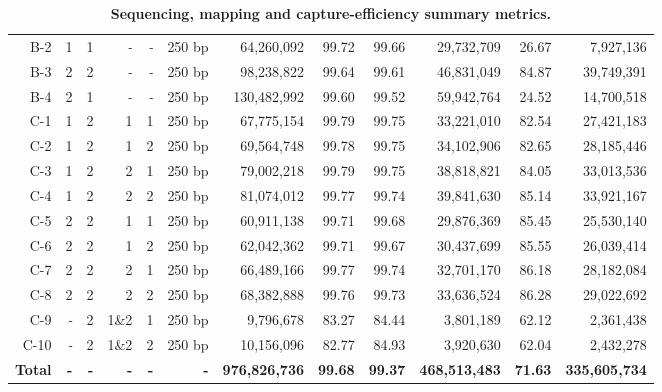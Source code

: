 \begin{sidewaystable}[p]
\begin{adjustbox}{width = 1\textwidth}
\begin{tabular}{rrrrrrrrrrrr}
        B-2 & 1 & 1 & \textit{-} & \textit{-} & 250 bp & 64,260,092 & 99.72 & 99.66 & 29,732,709 & 26.67 & 7,927,136 \\
        B-3 & 2 & 2 & \textit{-} & \textit{-} & 250 bp & 98,238,822 & 99.64 & 99.61 & 46,831,049 & 84.87 & 39,749,391 \\
        B-4 & 2 & 1 & \textit{-} & \textit{-} & 250 bp & 130,482,992 & 99.60 & 99.52 & 59,942,764 & 24.52 & 14,700,518 \\
		\cmidrule(l){1-1} \cmidrule(l){2-7} \cmidrule(l){8-9} \cmidrule(l){10-12}
        C-1 & 1 & 2 & 1 & 1 & 250 bp & 67,775,154 & 99.79 & 99.75 & 33,221,010 & 82.54 & 27,421,183 \\
        C-2 & 1 & 2 & 1 & 2 & 250 bp & 69,564,748 & 99.78 & 99.75 & 34,102,906 & 82.65 & 28,185,446 \\
        C-3 & 1 & 2 & 2 & 1 & 250 bp & 79,002,218 & 99.79 & 99.75 & 38,818,821 & 84.05 & 33,013,536 \\
        C-4 & 1 & 2 & 2 & 2 & 250 bp & 81,074,012 & 99.77 & 99.74 & 39,841,630 & 85.14 & 33,921,167 \\
        C-5 & 2 & 2 & 1 & 1 & 250 bp & 60,911,138 & 99.71 & 99.68 & 29,876,369 & 85.45 & 25,530,140 \\
        C-6 & 2 & 2 & 1 & 2 & 250 bp & 62,042,362 & 99.71 & 99.67 & 30,437,699 & 85.55 & 26,039,414 \\
        C-7 & 2 & 2 & 2 & 1 & 250 bp & 66,489,166 & 99.77 & 99.74 & 32,701,170 & 86.18 & 28,182,084 \\
        C-8 & 2 & 2 & 2 & 2 & 250 bp & 68,382,888 & 99.76 & 99.73 & 33,636,524 & 86.28 & 29,022,692 \\
		C-9 & \textit{-} & 2 & 1\&2 & 1 & 250 bp & 9,796,678 & 83.27 & 84.44 & 3,801,189 & 62.12 & 2,361,438 \\
		C-10 & \textit{-} & 2 & 1\&2 & 2 & 250 bp & 10,156,096 & 82.77 & 84.93 & 3,920,630 & 62.04 & 2,432,278 \\
		\cmidrule(l){1-1} \cmidrule(l){2-7} \cmidrule(l){8-9} \cmidrule(l){10-12}
		\textbf{Total} & \textbf{-} & \textbf{-} & \textbf{-} & \textbf{-} & \textbf{-} & \textbf{976,826,736} & \textbf{99.68} & \textbf{99.37} & \textbf{468,513,483} & \textbf{71.63} & \textbf{335,605,734} \\
        \bottomrule
    \end{tabular}
	\end{adjustbox}
    \caption[Sequencing, mapping and capture-efficiency summary metrics]
	{\textbf{Sequencing, mapping and capture-efficiency summary metrics.}
}
\end{sidewaystable}

